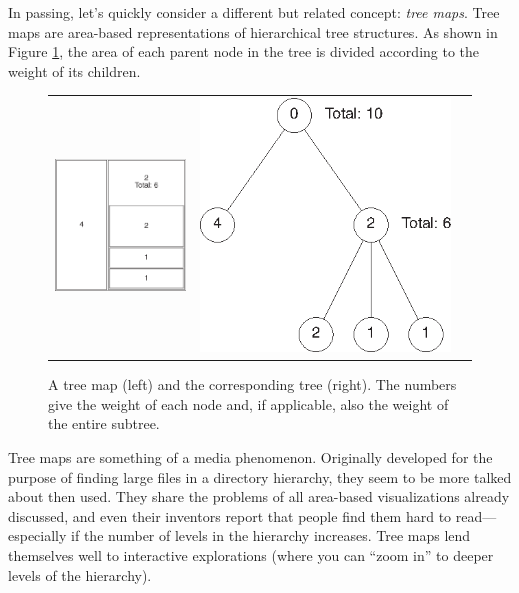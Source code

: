 In passing, let's quickly consider a different but related concept:
\emph{tree maps}. Tree maps are area-based representations of
hierarchical tree structures.  As shown in Figure \ref{fig:treemaps},
the area of each parent node in the tree is divided according to the
weight of its children.

\begin{figure}
  \begin{tabular}{ccc}
    \includegraphics[width=2in]{img/treemap1} &
    \hspace{1cm}
    \includegraphics{img/treemap2} 
  \end{tabular}
  \caption{A tree map (left) and the corresponding tree (right). The
    numbers give the weight of each node and, if applicable, also the
    weight of the entire subtree.}
  \label{fig:treemaps}
\end{figure}\pagebreak

Tree maps are something of a media phenomenon.  Originally developed
for the purpose of finding large files in a directory hierarchy, they
seem to be more talked about then used. They share the problems of all
area-based visualizations already discussed, and even their inventors
report that people find them hard to read---especially if the number
of levels in the hierarchy increases. Tree maps lend themselves well
to interactive explorations (where you can ``zoom in'' to deeper
levels of the hierarchy).

